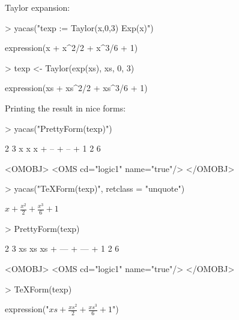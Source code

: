 \documentclass[]{article}
\begin{document}
Taylor expansion:
\begin{Schunk}
\begin{Sinput}
> yacas("texp := Taylor(x,0,3) Exp(x)")
\end{Sinput}
\begin{Soutput}
expression(x + x^2/2 + x^3/6 + 1)
\end{Soutput}
\end{Schunk}

\begin{Schunk}
\begin{Sinput}
> texp <- Taylor(exp(xs), xs, 0, 3)
\end{Sinput}
\begin{Soutput}
expression(xs + xs^2/2 + xs^3/6 + 1)
\end{Soutput}
\end{Schunk}


Printing the result in nice forms:
\begin{Schunk}
\begin{Sinput}
> yacas("PrettyForm(texp)") 
\end{Sinput}
\begin{Soutput}
     2    3    
    x    x     
x + -- + -- + 1
    2    6     

<OMOBJ>
  <OMS cd="logic1" name="true"/>
</OMOBJ>
\end{Soutput}
\begin{Sinput}
> yacas("TeXForm(texp)", retclass = "unquote")
\end{Sinput}
\begin{Soutput}
$x + \frac{x ^{2}}{2}  + \frac{x ^{3}}{6}  + 1$
\end{Soutput}
\end{Schunk}

\begin{Schunk}
\begin{Sinput}
> PrettyForm(texp) 
\end{Sinput}
\begin{Soutput}
       2     3    
     xs    xs     
xs + --- + --- + 1
      2     6     

<OMOBJ>
  <OMS cd="logic1" name="true"/>
</OMOBJ>
\end{Soutput}
\begin{Sinput}
> TeXForm(texp)
\end{Sinput}
\begin{Soutput}
expression("$xs + \frac{xs ^{2}}{2}  + \frac{xs ^{3}}{6}  + 1$")
\end{Soutput}
\end{Schunk}
\end{document}
